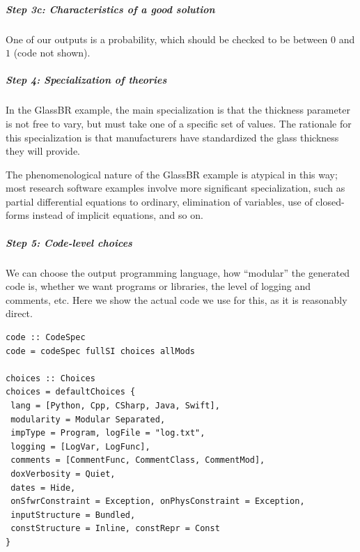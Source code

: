 \documentclass[a4paper,UKenglish,cleveref,autoref,thm-restate]{oasics-v2021}
\begin{document}
\subparagraph*{Step 3c: Characteristics of a good solution}
One of our outputs is a probability, which should be checked to be between $0$
and $1$ (code not shown).

\subparagraph*{Step 4: Specialization of theories}
In the GlassBR example, the main specialization is that the thickness parameter
is not free to vary, but must take one of a specific set of values. The
rationale for this specialization is that manufacturers have standardized the
glass thickness they will provide.

The phenomenological nature of the GlassBR example is atypical in this way; most
research software examples involve more significant specialization, such as
partial differential equations to ordinary, elimination of variables, use of
closed-forms instead of implicit equations, and so on.

%
%
%
%

\subparagraph*{Step 5: Code-level choices}
We can choose the output programming language, how ``modular'' the generated
code is, whether we want programs or libraries, the level of logging and
comments, etc. Here we show the actual code we use for this, as it is reasonably
direct.


\begin{lstlisting}
code :: CodeSpec
code = codeSpec fullSI choices allMods

choices :: Choices
choices = defaultChoices {
 lang = [Python, Cpp, CSharp, Java, Swift], 
 modularity = Modular Separated,
 impType = Program, logFile = "log.txt", 
 logging = [LogVar, LogFunc],
 comments = [CommentFunc, CommentClass, CommentMod], 
 doxVerbosity = Quiet,
 dates = Hide, 
 onSfwrConstraint = Exception, onPhysConstraint = Exception,
 inputStructure = Bundled, 
 constStructure = Inline, constRepr = Const
}
\end{lstlisting}
\end{document}
